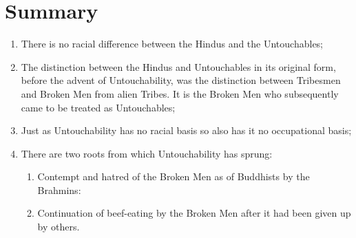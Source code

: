 \documentclass{article}
\begin{document}
\section{Summary}
\begin{shadequote}
  \begin{enumerate}
  \item There is no racial difference between the Hindus and the Untouchables;
  \item The distinction between the Hindus and Untouchables in its original form, before the advent of Untouchability, was the distinction between Tribesmen and Broken Men from alien Tribes. It is the Broken Men who subsequently came to be treated as Untouchables;
  \item Just as Untouchability has no racial basis so also has it no occupational basis;
  \item There are two roots from which Untouchability has sprung:
    \begin{enumerate}
    \item Contempt and hatred of the Broken Men as of Buddhists by the Brahmins:
    \item Continuation of beef-eating by the Broken Men after it had been given up by others.
    \end{enumerate}
  \end{enumerate}
\end{shadequote}



\end{document}
